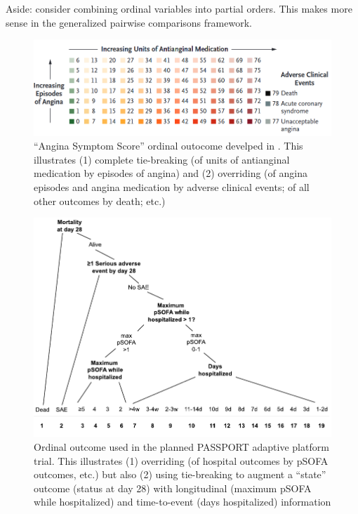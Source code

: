 \documentclass[
  11pt,
  fleqn
]{article}
\begin{document}
Aside: \citet{wittkowskiCombiningSeveralOrdinal2004} consider combining
ordinal variables into partial orders. This makes more sense in the
generalized pairwise comparisons framework.

\begin{figure}
  \includegraphics[width=6in]{rajkumar_et_al_outcome.png}
  \caption{``Angina Symptom Score'' ordinal outocome develped in
    \citep{rajkumarPlaceboControlledTrialPercutaneous2023}. This illustrates
    (1) complete tie-breaking (of units of antianginal medication by
    episodes of angina) and (2) overriding (of angina episodes and
      angina medication by adverse clinical events; of all other outcomes
  by death; etc.)}
  \label{fig:rajkumar_et_al_outcome}
\end{figure}

\begin{figure}
  \includegraphics[width=5.5in]{passport_ordinal_outcome_tree.pdf}
  \caption{Ordinal outcome used in the planned PASSPORT adaptive
    platform trial. This illustrates (1) overriding (of hospital
    outcomes by pSOFA outcomes, etc.) but also (2) using tie-breaking
    to augment a ``state'' outcome (status at day 28) with
    longitudinal (maximum pSOFA while hospitalized) and time-to-event
    (days hospitalized)
  information}
  \label{fig:passport_outcome}
\end{figure}
\end{document}
